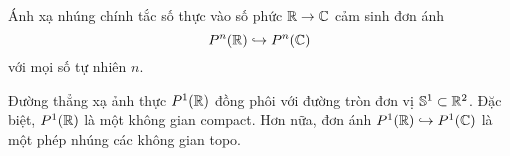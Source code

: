 Ánh xạ nhúng chính tắc số thực vào số phức $\mathbb{R} \to \mathbb{C}$ cảm sinh đơn ánh
\[P^n(\mathbb{R}) \hookrightarrow P^n(\mathbb{C})\]
với mọi số tự nhiên $n$.
\begin{prop}

    Đường thẳng xạ ảnh thực $P^1(\mathbb{R})$ đồng phôi với đường tròn đơn vị $\mathbb{S}^1\subset \mathbb{R}^2$. Đặc biệt, $P^1(\mathbb{R})$ là một không gian compact. Hơn nữa, đơn ánh $P^1(\mathbb{R}) \hookrightarrow P^1(\mathbb{C})$ là một phép nhúng các không gian topo.
\end{prop}
    








